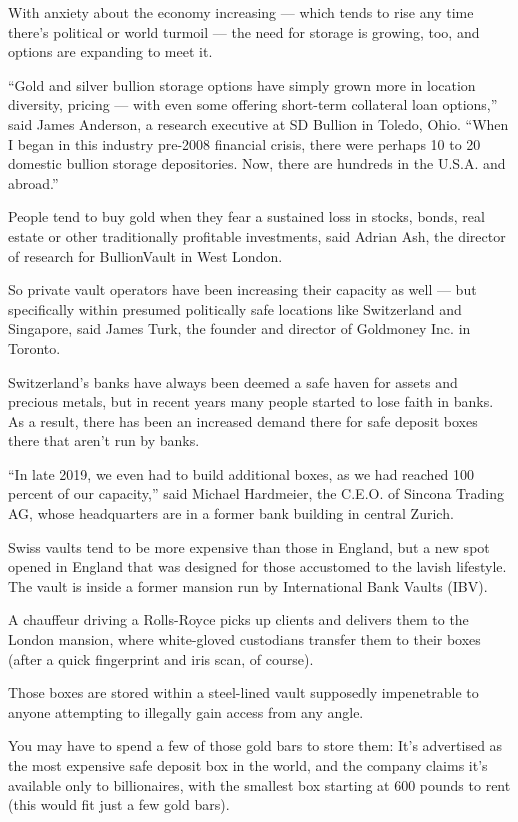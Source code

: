 With anxiety about the economy increasing --- which tends to rise any
time there's political or world turmoil --- the need for storage is
growing, too, and options are expanding to meet it.

``Gold and silver bullion storage options have simply grown more in
location diversity, pricing --- with even some offering short-term
collateral loan options,'' said James Anderson, a research executive at
SD Bullion in Toledo, Ohio. ``When I began in this industry pre-2008
financial crisis, there were perhaps 10 to 20 domestic bullion storage
depositories. Now, there are hundreds in the U.S.A. and abroad.''

People tend to buy gold when they fear a sustained loss in stocks,
bonds, real estate or other traditionally profitable investments, said
Adrian Ash, the director of research for BullionVault in West London.

So private vault operators have been increasing their capacity as well
--- but specifically within presumed politically safe locations like
Switzerland and Singapore, said James Turk, the founder and director of
Goldmoney Inc. in Toronto.

Switzerland's banks have always been deemed a safe haven for assets and
precious metals, but in recent years many people started to lose faith
in banks. As a result, there has been an increased demand there for safe
deposit boxes there that aren't run by banks.

``In late 2019, we even had to build additional boxes, as we had reached
100 percent of our capacity,'' said Michael Hardmeier, the C.E.O. of
Sincona Trading AG, whose headquarters are in a former bank building in
central Zurich.

Swiss vaults tend to be more expensive than those in England, but a new
spot opened in England that was designed for those accustomed to the
lavish lifestyle. The vault is inside a former mansion run by
International Bank Vaults (IBV).

A chauffeur driving a Rolls-Royce picks up clients and delivers them to
the London mansion, where white-gloved custodians transfer them to their
boxes (after a quick fingerprint and iris scan, of course).

Those boxes are stored within a steel-lined vault supposedly
impenetrable to anyone attempting to illegally gain access from any
angle.

You may have to spend a few of those gold bars to store them: It's
advertised as the most expensive safe deposit box in the world, and the
company claims it's available only to billionaires, with the smallest
box starting at 600 pounds to rent (this would fit just a few gold
bars).


